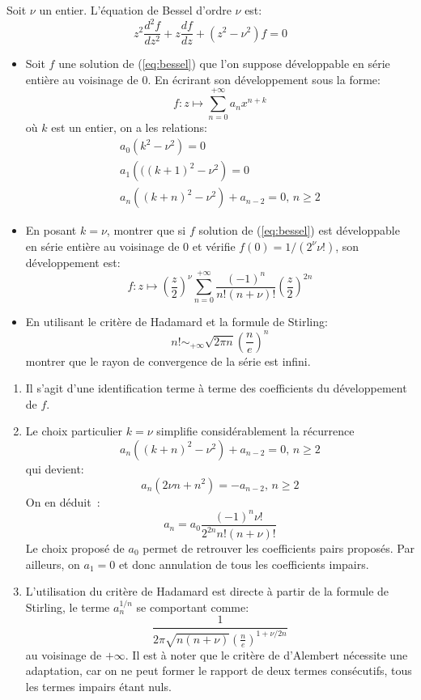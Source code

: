 \documentclass[a4paper, 12pt]{amsart}
\begin{document}
\begin{fex}
Soit $\nu$ un entier. L'équation de Bessel d'ordre $\nu$ est:
\begin{equation}\label{eq:bessel}
z^2 \frac{d^2f}{dz^2} + z \frac{df}{dz} + \left(z^2-\nu^2\right)f = 0
\end{equation}
\begin{itemize}
\item Soit $f$ une solution de (\ref{eq:bessel}) que l'on suppose développable en série entière au voisinage de $0$. En écrirant son développement sous la forme:
\[
f \colon z \mapsto \sum_{n=0}^{+\infty} a_n x^{n+k}
\]
où $k$ est un entier, on a les relations:
\begin{eqnarray}
a_0 \left(k^2 - \nu^2\right) = 0 \\
a_1 \left(((k+1)^2 - \nu^2\right) = 0 \\
a_n \left((k+n)^2 - \nu^2\right) + a_{n-2} = 0, \, n \geq 2
\end{eqnarray}
\item En posant $k = \nu$, montrer que si $f$ solution de (\ref{eq:bessel}) est développable en série entière au voisinage de $0$ et vérifie $f(0)=1/(2^\nu \nu!)$, son développement est:
\[
f \colon z \mapsto \left(\frac{z}{2}\right)^\nu \sum_{n=0}^{+\infty} \frac{(-1)^n}{n!(n+\nu)!}\left(\frac{z}{2}\right)^{2n}
\]
\item En utilisant le critère de Hadamard et la formule de Stirling:
\[
n! \sim_{+\infty} \sqrt{2 \pi n}\left(\frac{n}{e}\right)^n
\]
montrer que le rayon de convergence de la série est infini.
\end{itemize}
\end{fex}
\begin{enumerate}
\item Il s'agit d'une identification terme à terme des coefficients du développement de $f$.
\item Le choix particulier $k = \nu$ simplifie considérablement la récurrence
\[
a_n \left((k+n)^2 - \nu^2\right) + a_{n-2} = 0, \, n \geq 2
\]
qui devient:
\[
a_n \left(2\nu n + n^2\right) = - a_{n-2}, \, n \geq 2
\]
On en déduit~:
\[
a_n = a_0 \frac{(-1)^n\nu!}{2^{2n}n!(n+\nu)!}
\]
Le choix proposé de $a_0$ permet de retrouver les coefficients pairs proposés. Par ailleurs, on $a_1 =0$ et donc annulation de tous les coefficients impairs.
\item L'utilisation du critère de Hadamard est directe à partir de la formule de Stirling, le terme $a_n^{1/n}$ se comportant comme:
\[
\frac{1}{2\pi \sqrt{n(n+\nu)}\left(\frac{n}{e}\right)^{1+ \nu/2n}}
\]
au voisinage de $+\infty$. Il est à noter que le critère de d'Alembert nécessite une adaptation, car on ne peut former le rapport de deux termes consécutifs, tous les termes impairs étant nuls. 
\end{enumerate}
\end{document}
